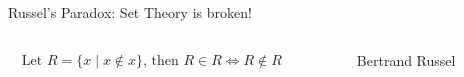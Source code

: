 \documentclass[aspectratio=169,10pt]{beamer}
\begin{document}
\begin{frame}
\begin{block}{Russel's Paradox: Set Theory is broken!}
\begin{columns}
      \begin{column}{0.65\textwidth}
        \begin{align*}
          \text{Let } R = \{x \mid x  \notin x\} \text{, then } R \in R \iff R\not \in R
        \end{align*}
      \end{column}
      \begin{column}{0.25\textwidth}
        \begin{figure}
          \caption{Bertrand Russel}
        \end{figure}
      \end{column}
    \end{columns}
  \end{block}
\end{frame}
\end{document}
